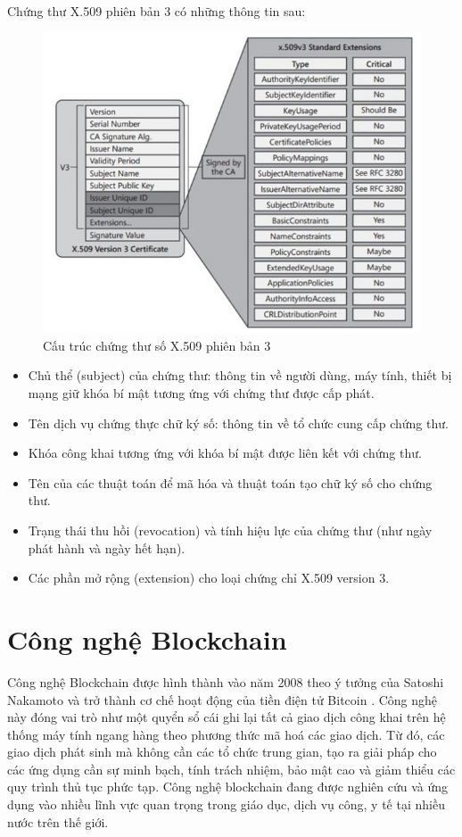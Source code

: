 Chứng thư X.509 phiên bản 3 có những thông tin sau:
\begin{figure}[htbp]
\centering
\includegraphics[width=.9\linewidth]{img/x509v3.jpg}
\caption{Cấu trúc chứng thư số X.509 phiên bản 3}
\end{figure}
\begin{itemize}

\item Chủ thể (subject) của chứng thư: thông tin về người dùng, máy tính, thiết bị mạng giữ khóa bí mật tương ứng với chứng thư được cấp phát.
\item Tên dịch vụ chứng thực chữ ký số: thông tin về tổ chức cung cấp chứng thư.
\item Khóa công khai tương ứng với khóa bí mật được liên kết với chứng thư.
\item Tên của các thuật toán để mã hóa và thuật toán tạo chữ ký số cho chứng thư.
\item Trạng thái thu hồi (revocation) và tính hiệu lực của chứng thư (như ngày phát hành và ngày hết hạn).
\item Các phần mở rộng (extension) cho loại chứng chỉ X.509 version 3.

\end{itemize}

\section{Công nghệ Blockchain}

Công nghệ Blockchain được hình thành vào năm 2008 theo ý tưởng của Satoshi Nakamoto và trở thành cơ chế hoạt động của tiền điện tử Bitcoin \cite{nakamoto2008bitcoin}. Công nghệ này đóng vai trò như một quyển sổ cái ghi lại tất cả giao dịch công khai trên hệ thống máy tính ngang hàng theo phương thức mã hoá các giao dịch. Từ đó, các giao dịch phát sinh mà không cần các tổ chức trung gian, tạo ra giải pháp cho các ứng dụng cần sự minh bạch, tính trách nhiệm, bảo mật cao và giảm thiểu các quy trình thủ tục phức tạp. Công nghệ blockchain đang được nghiên cứu và ứng dụng vào nhiều lĩnh vực quan trọng trong giáo dục, dịch vụ công, y tế tại nhiều nước trên thế giới.


